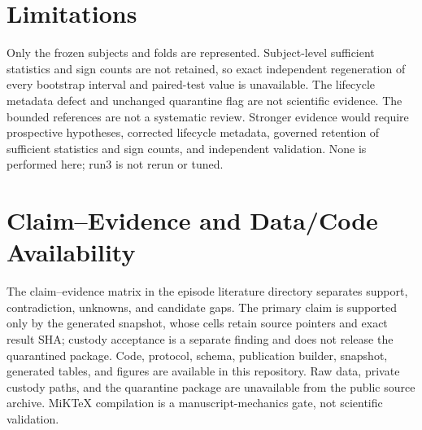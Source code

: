 \documentclass[11pt]{article}
\begin{document}
\section{Limitations}
Only the frozen \resultSubjects{} subjects and \resultFolds{} folds are represented. Subject-level sufficient statistics and sign counts are not retained, so exact independent regeneration of every bootstrap interval and paired-test value is unavailable. The lifecycle metadata defect and unchanged quarantine flag are not scientific evidence. The bounded references are not a systematic review. Stronger evidence would require prospective hypotheses, corrected lifecycle metadata, governed retention of sufficient statistics and sign counts, and independent validation. None is performed here; run3 is not rerun or tuned.

\section{Claim--Evidence and Data/Code Availability}
The claim--evidence matrix in the episode literature directory separates support, contradiction, unknowns, and candidate gaps. The primary claim is supported only by the generated snapshot, whose cells retain source pointers and exact result SHA; custody acceptance is a separate finding and does not release the quarantined package. Code, protocol, schema, publication builder, snapshot, generated tables, and figures are available in this repository. Raw data, private custody paths, and the quarantine package are unavailable from the public source archive. MiKTeX compilation is a manuscript-mechanics gate, not scientific validation.



\end{document}
